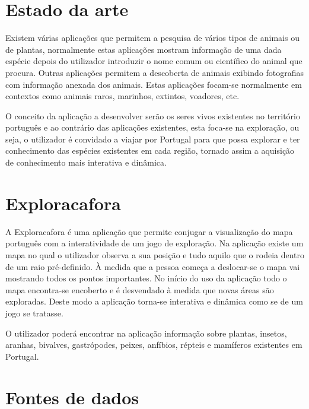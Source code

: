 \documentclass[twocolumn,twoside,11pt,a4paper]{article}
\begin{document}

\section{Estado da arte}\label{sec:sota}

Existem várias aplicações que permitem a pesquisa de vários tipos de animais ou de plantas, normalmente estas aplicações mostram informação de uma dada espécie depois do utilizador introduzir o nome comum ou científico do animal que procura. Outras aplicações permitem a descoberta de animais exibindo fotografias com informação anexada dos animais. Estas aplicações focam-se normalmente em contextos como animais raros, marinhos, extintos, voadores, etc.

O conceito da aplicação a desenvolver serão os seres vivos existentes no território português e ao contrário das aplicações existentes, esta foca-se na exploração, ou seja, o utilizador é convidado a viajar por Portugal para que possa explorar e ter conhecimento das espécies existentes em cada região, tornado assim a aquisição de conhecimento mais interativa e dinâmica.


\section{Exploracafora}\label{sec:application}

A Exploracafora é uma aplicação que permite conjugar a visualização do mapa português com a interatividade de um jogo de exploração. Na aplicação existe um mapa no qual o utilizador observa a sua posição e tudo aquilo que o rodeia dentro de um raio pré-definido. À medida que a pessoa começa a deslocar-se o mapa vai mostrando todos os pontos importantes. No início do uso da aplicação todo o mapa encontra-se encoberto e é desvendado à medida que novas áreas são exploradas. Deste modo a aplicação torna-se interativa e dinâmica como se de um jogo se tratasse.

O utilizador poderá encontrar na aplicação informação sobre plantas, insetos, aranhas, bivalves, gastrópodes, peixes, anfíbios, répteis e mamíferos existentes em Portugal. 

\section{Fontes de dados}\label{sec:datamodel}
\end{document}
